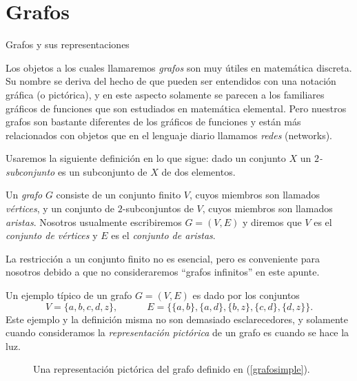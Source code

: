 \chapter[Grafos]{Grafos}\label{cap.grafos}

\begin{section}{Grafos y sus representaciones}\label{seccion-grafos}

Los objetos a los cuales llamaremos \textit{grafos} son muy útiles en matemática discreta. Su nombre se deriva del hecho de que pueden ser entendidos con una notación gráfica (o pictórica), y en este aspecto solamente se parecen a los familiares gráficos de funciones que son estudiados en matemática elemental. Pero
nuestros grafos son bastante diferentes de los gráficos de funciones y están más relacionados con objetos que en el lenguaje diario llamamos \textit{redes} (networks).  

Usaremos la siguiente definición en lo que sigue: dado un conjunto $X$ un \textit{$2$-subconjunto} es un subconjunto de $X$ de dos elementos.  

\begin{definicion} Un \textit{grafo} $G$ consiste de un   conjunto finito $V$, cuyos miembros son llamados  \textit{vértices},   y un conjunto de $2$-subconjuntos de $V$, cuyos miembros son llamados \textit{aristas}.   Nosotros usualmente escribiremos $G=(V,E)$ y diremos que $V$ es el \textit{conjunto de vértices} y $E$ es el \textit{conjunto de aristas}.
\end{definicion}

La restricción a un conjunto finito no es esencial, pero es conveniente para nosotros debido a que no consideraremos ``grafos infinitos'' en este apunte.

Un ejemplo típico de un grafo $G=(V,E)$ es dado por los conjuntos
\begin{equation}\label{grafosimple}
V=\{a,b,c,d,z\}, \qquad\quad
E=\{\{a,b\},\{a,d\},\{b,z\},\{c,d\},\{d,z\}\}.
\end{equation}
Este ejemplo y la definición misma no son demasiado esclarecedores, y solamente cuando con\-si\-de\-ra\-mos la \textit{representación pictórica} de un grafo es cuando se hace la luz. 

\begin{figure}[ht]
    \begin{center}
    \end{center}    
    \caption{Una representación pictórica del grafo definido en (\ref{grafosimple}).}\label{f5.1}
\end{figure}





\end{section}
